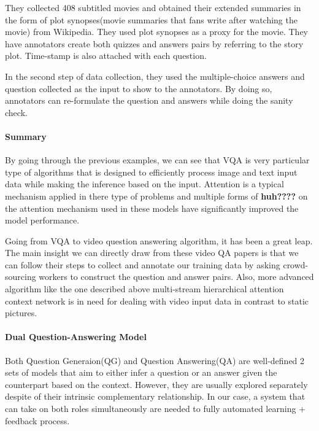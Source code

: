 \documentclass[]{book}
\let\oldparagraph\paragraph
\renewcommand{\paragraph}[1]{\oldparagraph{#1}\mbox{}}
\theoremstyle{definition}
\theoremstyle{definition}
\theoremstyle{definition}
\theoremstyle{remark}
\begin{document}
They collected 408 subtitled movies and obtained their extended
summaries in the form of plot synopses(movie summaries that fans write
after watching the movie) from Wikipedia. They used plot synopses as a
proxy for the movie. They have annotators create both quizzes and
answers pairs by referring to the story plot. Time-stamp is also
attached with each question.

In the second step of data collection, they used the multiple-choice
answers and question collected as the input to show to the annotators.
By doing so, annotators can re-formulate the question and answers while
doing the sanity check.

\paragraph{Summary}\label{summary-1}

By going through the previous examples, we can see that VQA is very
particular type of algorithms that is designed to efficiently process
image and text input data while making the inference based on the input.
Attention is a typical mechanism applied in there type of problems and
multiple forms of \textbf{huh????} on the attention mechanism used in
these models have significantly improved the model performance.

Going from VQA to video question answering algorithm, it has been a
great leap. The main insight we can directly draw from these video QA
papers is that we can follow their steps to collect and annotate our
training data by asking crowd-sourcing workers to construct the question
and answer pairs. Also, more advanced algorithm like the one described
above multi-stream hierarchical attention context network is in need for
dealing with video input data in contrast to static pictures.

\paragraph{Dual Question-Answering
Model}\label{dual-question-answering-model}

Both Question Generaion(QG) and Question Answering(QA) are well-defined
2 sets of models that aim to either infer a question or an answer given
the counterpart based on the context. However, they are usually explored
separately despite of their intrinsic complementary relationship. In our
case, a system that can take on both roles simultaneously are needed to
fully automated learning + feedback process.
\end{document}
